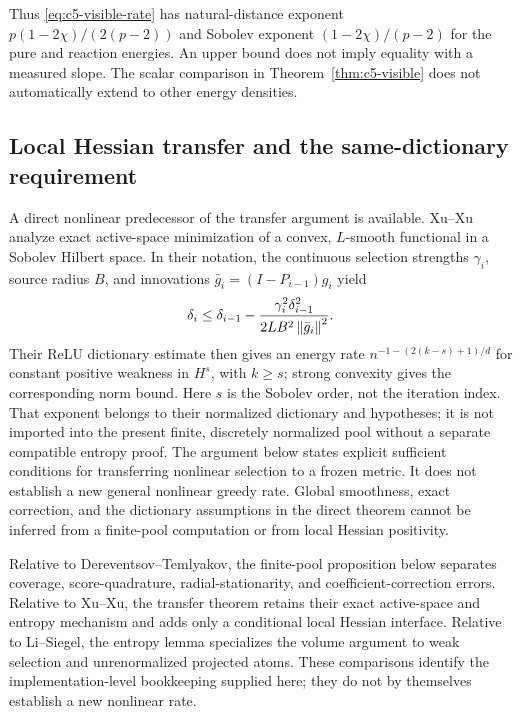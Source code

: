 \documentclass[11pt]{article}
\theoremstyle{remark}
\begin{document}
Thus \eqref{eq:c5-visible-rate} has natural-distance exponent
$p(1-2\chi)/(2(p-2))$ and Sobolev exponent $(1-2\chi)/(p-2)$ for the
pure and reaction energies. An upper bound does not imply equality
with a measured slope. The scalar comparison in Theorem~\ref{thm:c5-visible}
does not automatically extend to other energy densities.

\subsection{Local Hessian transfer and the same-dictionary requirement}
\label{sec:c5-hessian}

A direct nonlinear predecessor of the transfer argument is available.
Xu--Xu \cite[Theorem~3.1, equations~(17)--(19)]{XuXu2025}
analyze exact active-space minimization of a convex, $L$-smooth
functional in a Sobolev Hilbert space. In their notation, the continuous
selection strengths $\gamma_i$, source radius $B$, and innovations
$\bar g_i=(I-P_{i-1})g_i$ yield
\[
 \delta_i\leq\delta_{i-1}
 -\frac{\gamma_i^2\delta_{i-1}^2}{2LB^2\left\lVert\bar g_i\right\rVert^2}.
\]
Their ReLU dictionary estimate then gives an energy rate
$n^{-1-(2(k-s)+1)/d}$ for constant positive weakness in $H^s$,
with $k\geq s$; strong convexity gives the corresponding norm bound.
Here $s$ is the Sobolev order, not the iteration index.
That exponent belongs to their normalized dictionary and hypotheses; it is
not imported into the present finite, discretely normalized pool without a
separate compatible entropy proof.
The argument below states explicit sufficient conditions for
transferring nonlinear selection to a frozen metric. It does not establish
a new general nonlinear greedy rate. Global smoothness, exact correction,
and the dictionary assumptions in the direct theorem cannot be inferred
from a finite-pool computation or from local Hessian positivity.

Relative to Dereventsov--Temlyakov, the finite-pool proposition below
separates coverage, score-quadrature, radial-stationarity, and
coefficient-correction errors. Relative to Xu--Xu, the transfer theorem
retains their exact active-space and entropy mechanism and adds only a
conditional local Hessian interface. Relative to Li--Siegel, the entropy
lemma specializes the volume argument to weak selection and unrenormalized
projected atoms. These comparisons identify the implementation-level
bookkeeping supplied here; they do not by themselves establish a new
nonlinear rate.
\end{document}
